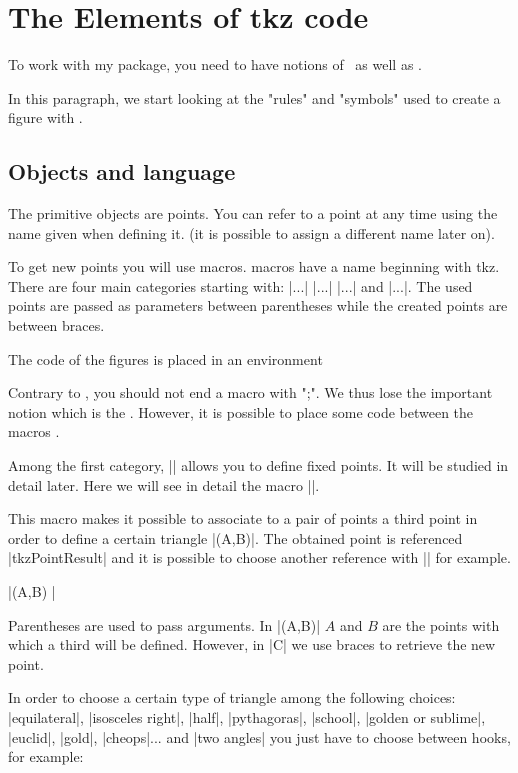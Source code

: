 \section{The Elements of tkz code}

To work with my package, you need to have notions of \LATEX\ as well as \TIKZ.

In this paragraph, we start looking at the "rules" and "symbols" used to create a figure with \tkzname{\tkznameofpack}.

\subsection{Objects and language}

 The primitive objects are points. You can refer to a point at any time using the name given when defining it. (it is possible to assign a different name later on).

To get new points you will use macros. \tkzname{\tkznameofpack} macros have a name beginning with tkz. There are four main categories starting with:
|\tkzDef...| |\tkzDraw...| |\tkzMark...| and |\tkzLabel...|. 
The used points are passed as parameters between parentheses while the created points are between braces.

The code of the figures is placed in an environment 


Contrary to \TIKZ, you should not end a macro with  ";". We thus lose the important notion which is the . However, it is possible to place some code between the macros \tkzname{\tkznameofpack}.
 

Among the first category, |\tkzDefPoint| allows you to define fixed points. It will be studied in detail later. Here we will see in detail the macro  |\tkzDefTriangle|.

This macro makes it possible to associate to a pair of points a third point in order to define a certain triangle |\tkzDefTriangle(A,B)|. The obtained point is referenced |tkzPointResult| and it is possible to choose another reference with || for example.

|\tkzDefTriangle[euclid](A,B) |

Parentheses are used to pass arguments. In |(A,B)| $A$ and $B$ are the points with which a third will be defined. However, in |{C}| we use braces to retrieve the new point.

In order to choose a certain type of triangle among the following choices:
  |equilateral|,  |isosceles right|, |half|, |pythagoras|, |school|, |golden or sublime|, |euclid|, |gold|, |cheops|...
 and |two angles| you just have to choose between hooks, for example:
 
